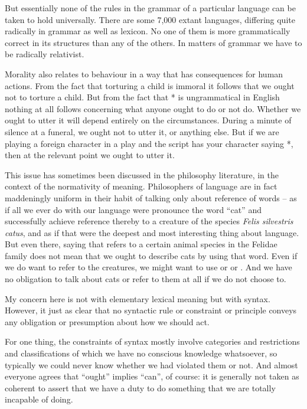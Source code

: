 \documentclass[output=paper]{langscibook}
\begin{document}
But essentially none of the rules in the grammar of a particular language can be taken to hold universally. There are some 7,000 extant languages, differing quite radically in grammar as well as lexicon.  No one of them is more grammatically correct in its structures than any of the others. In matters of grammar we have to be radically relativist.

Morality also relates to behaviour in a way that has consequences for human actions.  From the fact that torturing a child is immoral it follows that we ought not to torture a child.  But from the fact that * is ungrammatical in English nothing at all follows concerning what anyone ought to do or not do.  Whether we ought to utter it will depend entirely on the circumstances.  During a minute of silence at a funeral, we ought not to utter it, or anything else.  But if we are playing a foreign character in a play and the script has your character saying *, then at the relevant point we ought to utter it.

This issue has sometimes been discussed in the philosophy literature, in the context of the normativity of meaning.  Philosophers of language are in fact maddeningly uniform in their habit of talking only about reference of words – as if all we ever do with our language were pronounce the word ``cat'' and successfully achieve reference thereby to a creature of the species \textit{Felis silvestris catus}, and as if that were the deepest and most interesting thing about language.  But even there, saying that  refers to a certain animal species in the Felidae family does not mean that we ought to describe cats by using that word.  Even if we do want to refer to the creatures, we might want to use  or  or .  And we have no obligation to talk about cats or refer to them at all if we do not choose to.

My concern here is not with elementary lexical meaning but with syntax. However, it just as clear that no syntactic rule or constraint or principle conveys any obligation or presumption about how we should act.

For one thing, the constraints of syntax mostly involve categories and restrictions and classifications of which we have no conscious knowledge whatsoever, so typically we could never know whether we had violated them or not.  And almost everyone agrees that ``ought'' implies ``can'', of course: it is generally not taken as coherent to assert that we have a duty to do something that we are totally incapable of doing.
\end{document}
